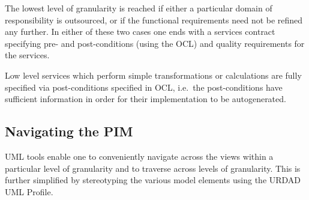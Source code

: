 The lowest level of granularity is reached if either a particular domain
of responsibility is outsourced, or if the functional requirements need not be
refined any further. In either of these two cases one ends with a services
contract specifying pre- and post-conditions (using the OCL) and quality
requirements for the services.

Low level services which perform simple transformations or calculations are
fully specified via post-conditions specified in OCL, i.e.\ the post-conditions
have sufficient information in order for their implementation to be autogenerated.

\subsection{Navigating the PIM}

UML tools enable one to conveniently navigate across the views within a particular level of granularity and to traverse across levels of granularity. This is further simplified
by stereotyping the various model elements using the URDAD UML Profile.



